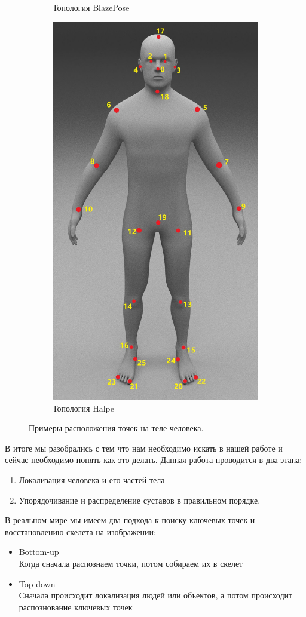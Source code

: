 \begin{figure}[h]
\begin{subfigure}[b]{.3\textwidth}
    \caption{Топология BlazePose}
    \label{fig:BlazePose_topology}
\end{subfigure}
\begin{subfigure}[b]{.3\textwidth}
	\centering
    \includegraphics[height=\textwidth]{./images/Halpe_topology.jpg}
    \caption{Топология Halpe}
    \label{fig:Halpe_topology}
\end{subfigure}
    \caption{Примеры расположения точек на теле человека.}
\end{figure}

В итоге мы разобрались с тем что нам необходимо искать в нашей работе и сейчас необходимо понять как это делать. Данная работа проводится в два этапа: 
\begin{enumerate}
	\item Локализация человека и его частей тела
	\item Упорядочивание и распределение суставов в правильном порядке.
\end{enumerate}

В реальном мире мы имеем два подхода к поиску ключевых точек и восстановлению скелета на изображении:
\begin{itemize}
	\item Bottom-up\\
	Когда сначала распознаем точки,  потом собираем их в скелет
	\item Top-down\\
	Сначала происходит локализация людей или объектов, а потом происходит распознование ключевых точек
\end{itemize}

